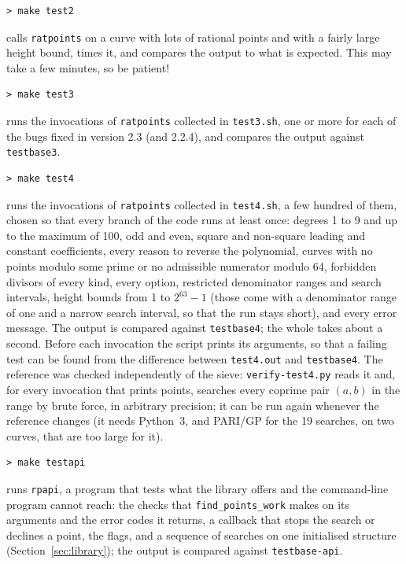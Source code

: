 \documentclass[12pt,a4paper,oneside]{amsart}
\begin{document}
\begin{verbatim}
> make test2
\end{verbatim}
calls \texttt{ratpoints} on a curve with lots of rational points and with
a fairly large height bound, times it, and compares the output to what is
expected. This may take a few minutes, so be patient!

\begin{verbatim}
> make test3
\end{verbatim}
runs the invocations of \texttt{ratpoints} collected in \texttt{test3.sh},
one or more for each of the bugs fixed in version 2.3 (and 2.2.4), and
compares the output against \texttt{testbase3}.

\begin{verbatim}
> make test4
\end{verbatim}
runs the invocations of \texttt{ratpoints} collected in \texttt{test4.sh},
a few hundred of them, chosen so that every branch of the code runs at
least once: degrees 1 to 9 and up to the maximum of 100, odd and even, square and non-square
leading and constant coefficients, every reason to reverse the polynomial,
curves with no points modulo some prime or no admissible numerator modulo
64, forbidden divisors of every kind, every option, restricted denominator
ranges and search intervals, height bounds from 1 to $2^{63}-1$ (those come
with a denominator range of one and a narrow search interval, so that the
run stays short), and every error message.  The output is compared against
\texttt{testbase4}; the whole takes about a second.  Before each invocation
the script prints its arguments, so that a failing test can be found from
the difference between \texttt{test4.out} and \texttt{testbase4}.  The
reference was checked independently of the sieve: \texttt{verify-test4.py}
reads it and, for every invocation that prints points, searches every
coprime pair $(a, b)$ in the range by brute force, in arbitrary precision;
it can be run again whenever the reference changes (it needs Python~3, and
PARI/GP for the 19 searches, on two curves, that are too large for it).

\begin{verbatim}
> make testapi
\end{verbatim}
runs \texttt{rpapi}, a program that tests what the library offers and the
command-line program cannot reach: the checks that
\texttt{find\_points\_work} makes on its arguments and the error codes it
returns, a callback that stops the search or declines a point, the flags,
and a sequence of searches on one initialised structure
(Section~\ref{sec:library}); the output is compared against
\texttt{testbase-api}.
\end{document}
